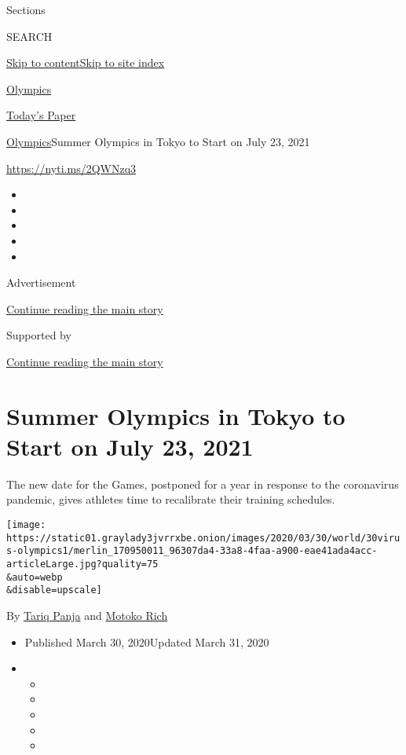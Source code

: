 Sections

SEARCH

\protect\hyperlink{site-content}{Skip to
content}\protect\hyperlink{site-index}{Skip to site index}

\href{https://www.nytimes3xbfgragh.onion/section/sports/olympics}{Olympics}

\href{https://myaccount.nytimes3xbfgragh.onion/auth/login?response_type=cookie\&client_id=vi}{}

\href{https://www.nytimes3xbfgragh.onion/section/todayspaper}{Today's
Paper}

\href{/section/sports/olympics}{Olympics}\textbar{}Summer Olympics in
Tokyo to Start on July 23, 2021

\url{https://nyti.ms/2QWNzq3}

\begin{itemize}
\item
\item
\item
\item
\item
\end{itemize}

Advertisement

\protect\hyperlink{after-top}{Continue reading the main story}

Supported by

\protect\hyperlink{after-sponsor}{Continue reading the main story}

\hypertarget{summer-olympics-in-tokyo-to-start-on-july-23-2021}{%
\section{Summer Olympics in Tokyo to Start on July 23,
2021}\label{summer-olympics-in-tokyo-to-start-on-july-23-2021}}

The new date for the Games, postponed for a year in response to the
coronavirus pandemic, gives athletes time to recalibrate their training
schedules.

\texttt{[image: https://static01.graylady3jvrrxbe.onion/images/2020/03/30/world/30virus-olympics1/merlin\_170950011\_96307da4-33a8-4faa-a900-eae41ada4acc-articleLarge.jpg?quality=75\\\&auto=webp\\\&disable=upscale]}

By \href{https://www.nytimes3xbfgragh.onion/by/tariq-panja}{Tariq Panja}
and \href{https://www.nytimes3xbfgragh.onion/by/motoko-rich}{Motoko
Rich}

\begin{itemize}
\item
  Published March 30, 2020Updated March 31, 2020
\item
  \begin{itemize}
  \item
  \item
  \item
  \item
  \item
  \end{itemize}
\end{itemize}

